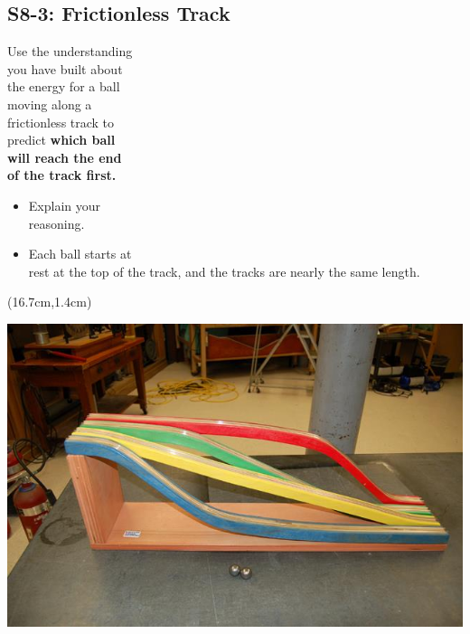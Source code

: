\documentclass[]{article}
\begin{document}
\begin{PresentSpace}
\vspace{-10pt}
\section*{S8-3: Frictionless Track}
\vspace{-5pt}
Use the understanding \\
you have built about \\
the energy for a ball \\
moving along a \\
frictionless track to \\predict \textbf{which ball} \\
\textbf{will reach the end} \\
\textbf{of the track first.}
\begin{itemize}
	\item Explain your \\
	reasoning.
	\item Each ball starts at \\
	rest at the top of the track, and the tracks are nearly the same length.
\end{itemize}
\end{PresentSpace}
\begin{textblock*}{9cm}(16.7cm,1.4cm)
\begin{center}
	\includegraphics[scale=0.5]{FourFrictionless.png}
\end{center}
\end{textblock*}
\newpage
\end{document}
